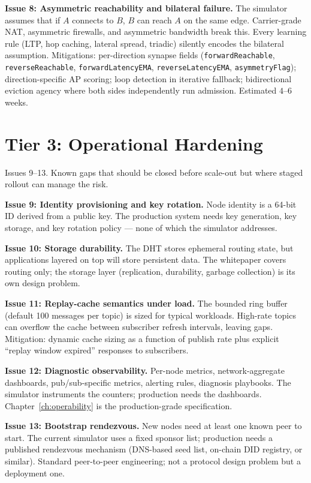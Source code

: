 \documentclass[twoside,nobib]{tufte-book}
\begin{document}
\textbf{Issue 8: Asymmetric reachability and bilateral
failure.} The simulator assumes that if $A$ connects to $B$,
$B$ can reach $A$ on the same edge. Carrier-grade NAT,
asymmetric firewalls, and asymmetric bandwidth break this. Every
learning rule (LTP, hop caching, lateral spread, triadic) silently
encodes the bilateral assumption. Mitigations: per-direction
synapse fields (\texttt{forwardReachable}, \texttt{reverseReachable},
\texttt{forwardLatencyEMA}, \texttt{reverseLatencyEMA},
\texttt{asymmetryFlag}); direction-specific AP scoring; loop
detection in iterative fallback; bidirectional eviction agency
where both sides independently run admission. Estimated $4$--$6$ weeks.

\section{Tier 3: Operational Hardening}

Issues 9--13. Known gaps that should be closed before scale-out
but where staged rollout can manage the risk.

\textbf{Issue 9: Identity provisioning and key rotation.} Node
identity is a 64-bit ID derived from a public key. The
production system needs key generation, key storage, and key
rotation policy --- none of which the simulator addresses.

\textbf{Issue 10: Storage durability.} The DHT stores ephemeral
routing state, but applications layered on top will store
persistent data. The whitepaper covers routing only; the storage
layer (replication, durability, garbage collection) is its own
design problem.

\textbf{Issue 11: Replay-cache semantics under load.} The
bounded ring buffer (default 100 messages per topic) is sized
for typical workloads. High-rate topics can overflow the cache
between subscriber refresh intervals, leaving gaps. Mitigation:
dynamic cache sizing as a function of publish rate plus
explicit ``replay window expired'' responses to subscribers.

\textbf{Issue 12: Diagnostic observability.} Per-node metrics,
network-aggregate dashboards, pub/sub-specific metrics, alerting
rules, diagnosis playbooks. The simulator instruments the
counters; production needs the dashboards.
Chapter~\ref{ch:operability} is the production-grade
specification.

\textbf{Issue 13: Bootstrap rendezvous.} New nodes need at least
one known peer to start. The current simulator uses a fixed
sponsor list; production needs a published rendezvous mechanism
(DNS-based seed list, on-chain DID registry, or similar). Standard
peer-to-peer engineering; not a protocol design problem but a
deployment one.
\end{document}
